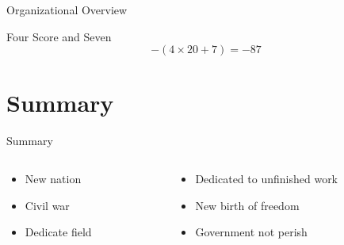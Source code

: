 \documentclass{beamer}
\begin{document}
\begin{frame}{Organizational Overview}

\begin{figure}
\end{figure}

\begin{block}{Four Score and Seven}
\begin{equation}
-(4 \times 20 + 7) = -87
\end{equation}
\end{block}

\end{frame}

\section{Summary}

\begin{frame}{Summary}

\begin{columns}
\begin{column}{0.4\textwidth}
\begin{itemize}
\item New nation
\item Civil war
\item Dedicate field
\end{itemize}
\end{column}
\begin{column}{0.6\textwidth}
\begin{itemize}
\item Dedicated to unfinished work
\item New birth of freedom
\item Government not perish
\end{itemize}
\end{column}
\end{columns}

\end{frame}
\end{document}
